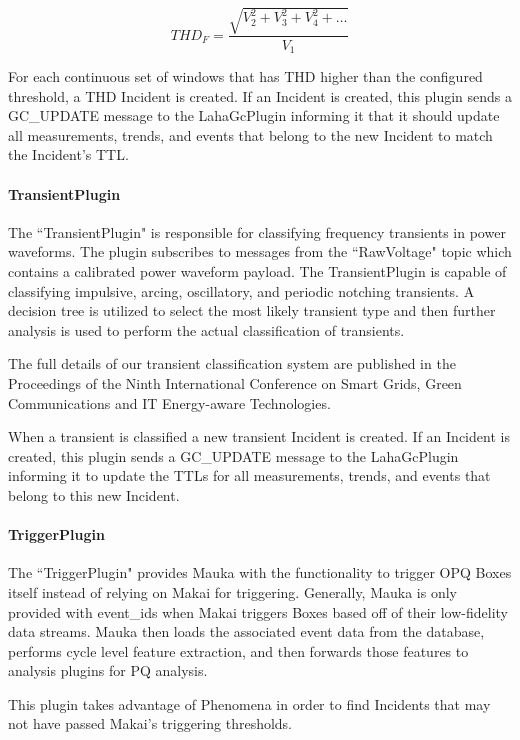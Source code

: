\begin{equation}
\label{equation:Thd}
	THD_F = \frac{\sqrt{V_2^2 + V_3^2 + V_4^2 + \dots}}{V_1}
\end{equation}

For each continuous set of windows that has THD higher than the configured threshold, a THD Incident is created. If an Incident is created, this plugin sends a GC\_UPDATE message to the LahaGcPlugin informing it that it should update all measurements, trends, and events that belong to the new Incident to match the Incident's TTL\@.


\paragraph{TransientPlugin}
The ``TransientPlugin" is responsible for classifying frequency transients in power waveforms. The plugin subscribes to messages from the ``RawVoltage" topic which contains a calibrated power waveform payload. The TransientPlugin is capable of classifying impulsive, arcing, oscillatory, and periodic notching transients. A decision tree is utilized to select the most likely transient type and then further analysis is used to perform the actual classification of transients.

The full details of our transient classification system are published in the Proceedings of the Ninth International Conference on Smart Grids, Green Communications and IT Energy-aware Technologies\cite{csdl2-19-02}.

When a transient is classified a new transient Incident is created. If an Incident is created, this plugin sends a GC\_UPDATE message to the LahaGcPlugin informing it to update the TTLs for all measurements, trends, and events that belong to this new Incident.

\paragraph{TriggerPlugin}\label{sec:trigger_plugin}
The ``TriggerPlugin" provides Mauka with the functionality to trigger OPQ Boxes itself instead of relying on Makai for triggering. Generally, Mauka is only provided with event\_ids when Makai triggers Boxes based off of their low-fidelity data streams. Mauka then loads the associated event data from the database, performs cycle level feature extraction, and then forwards those features to analysis plugins for PQ analysis.

This plugin takes advantage of Phenomena in order to find Incidents that may not have passed Makai's triggering thresholds.

